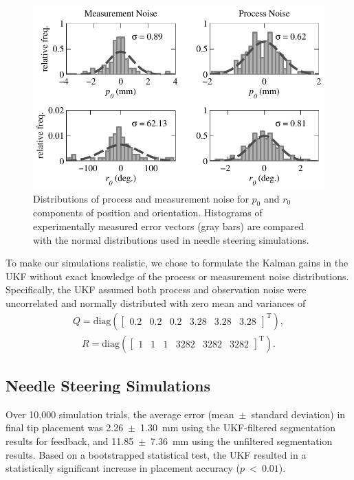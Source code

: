 \begin{figure}[!t]
\centering
\includegraphics[width=0.75\columnwidth]{Images/Chapter4/Noise/Noise}%
\caption[Distributions of process and measurement noise]{Distributions of process and measurement noise for $p_0$ and $r_0$ components of position and orientation. Histograms of experimentally measured error vectors (gray bars) are compared with the normal distributions used in needle steering simulations.}
\label{fig:Noise}
\end{figure}

To make our simulations realistic, we chose to formulate the Kalman gains in the UKF without exact knowledge of the process or measurement noise distributions. Specifically, the UKF assumed both process and observation noise were uncorrelated and normally distributed with zero mean and variances of 
\begin{align*}
{Q} = \text{diag}\left(\begin{bmatrix} 0.2 & 0.2 & 0.2 & 3.28 & 3.28 & 3.28 \end{bmatrix}^{\text{T}}\right),
\end{align*}
\begin{align*}
{R} = \text{diag}\left(\begin{bmatrix} 1 & 1 & 1 & 3282 & 3282 & 3282 \end{bmatrix}^{\text{T}}\right).
\end{align*}

\subsection{Needle Steering Simulations}
Over 10,000 simulation trials, the average error (mean~$\pm$~standard deviation) in final tip placement was 2.26~$\pm$~1.30~mm using the UKF-filtered segmentation results for feedback, and 11.85~$\pm$~7.36~mm using the unfiltered segmentation results. Based on a bootstrapped statistical test, the UKF resulted in a statistically significant increase in placement accuracy ($p~<~0.01$).

